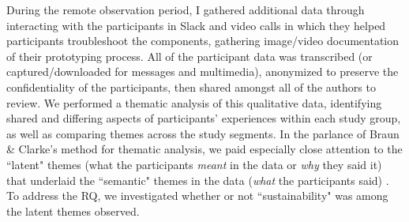 During the remote observation period, I gathered additional data through interacting with the participants in Slack and video calls in which they helped participants troubleshoot the components, gathering image/video documentation of their prototyping process.
All of the participant data was transcribed (or captured/downloaded for messages and multimedia), anonymized to preserve the confidentiality of the participants, then shared amongst all of the authors to review. We performed a thematic analysis of this qualitative data, identifying shared and differing aspects of participants' experiences within each study group, as well as comparing themes across the study segments. In the parlance of Braun \& Clarke's method for thematic analysis, we paid especially close attention to the ``latent" themes (what the participants \textit{meant} in the data or \textit{why} they said it) that underlaid the ``semantic" themes in the data (\textit{what} the participants said) \cite{braun_using_2006, maguire_doing_2017}. To address the RQ, we investigated whether or not ``sustainability" was among the latent themes observed.




